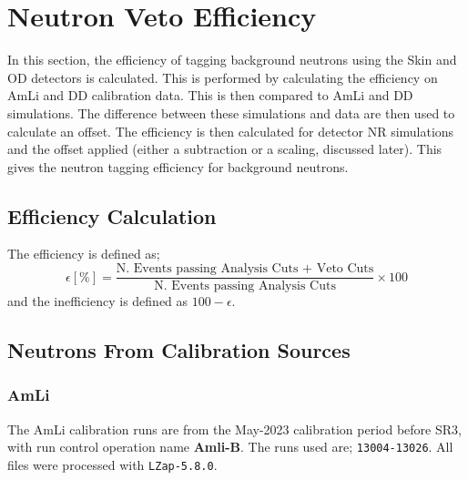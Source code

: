 \section{Neutron Veto Efficiency \label{sec:efficiency}}
In this section, the efficiency of tagging background neutrons using the Skin and OD detectors is calculated.
This is performed by calculating the efficiency on AmLi and DD calibration data. 
This is then compared to AmLi and DD simulations.
The difference between these simulations and data are then used to calculate an offset.
The efficiency is then calculated for detector NR simulations and the offset applied (either a subtraction or a scaling, discussed later).
This gives the neutron tagging efficiency for background neutrons.

\subsection{Efficiency Calculation}
The efficiency is defined as;
\begin{equation}
    \epsilon [\%] = \frac{\textrm{N. Events passing Analysis Cuts + Veto Cuts}}{\textrm{N. Events passing Analysis Cuts}} \times 100
    \label{eq:neutron_tagging_efficiency}
\end{equation}
and the inefficiency is defined as $100 - \epsilon$.

\subsection{Neutrons From Calibration Sources \label{sec:AmLi_Efficiency}}
\subsubsection{AmLi} 
The AmLi calibration runs are from the May-2023 calibration period before SR3, with run control operation name \textbf{Amli-B}.
The runs used are; \lstinline{13004-13026}.
All files were processed with \lstinline{LZap-5.8.0}.


